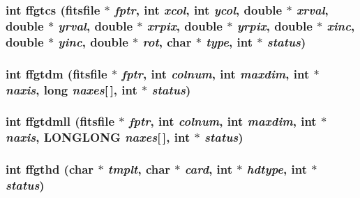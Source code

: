 \subsubsection{\setlength{\rightskip}{0pt plus 5cm}int ffgtcs (\bf{fitsfile} $\ast$ {\em fptr}, int {\em xcol}, int {\em ycol}, double $\ast$ {\em xrval}, double $\ast$ {\em yrval}, double $\ast$ {\em xrpix}, double $\ast$ {\em yrpix}, double $\ast$ {\em xinc}, double $\ast$ {\em yinc}, double $\ast$ {\em rot}, char $\ast$ {\em type}, int $\ast$ {\em status})}\label{test_2roimasker_2fitsio_8h_6042577fa44af9cdcbdffc1362a9f4a0}


\subsubsection{\setlength{\rightskip}{0pt plus 5cm}int ffgtdm (\bf{fitsfile} $\ast$ {\em fptr}, int {\em colnum}, int {\em maxdim}, int $\ast$ {\em naxis}, long {\em naxes}[$\,$], int $\ast$ {\em status})}\label{test_2roimasker_2fitsio_8h_bc3ab97c21648b47aa3b8f883834db1d}


\subsubsection{\setlength{\rightskip}{0pt plus 5cm}int ffgtdmll (\bf{fitsfile} $\ast$ {\em fptr}, int {\em colnum}, int {\em maxdim}, int $\ast$ {\em naxis}, \bf{LONGLONG} {\em naxes}[$\,$], int $\ast$ {\em status})}\label{test_2roimasker_2fitsio_8h_37098ac493b769dba1d2055cbc7d3c28}


\subsubsection{\setlength{\rightskip}{0pt plus 5cm}int ffgthd (char $\ast$ {\em tmplt}, char $\ast$ {\em card}, int $\ast$ {\em hdtype}, int $\ast$ {\em status})}\label{test_2roimasker_2fitsio_8h_d6a4e75b3a5f5458a4879db512e5dc79}


